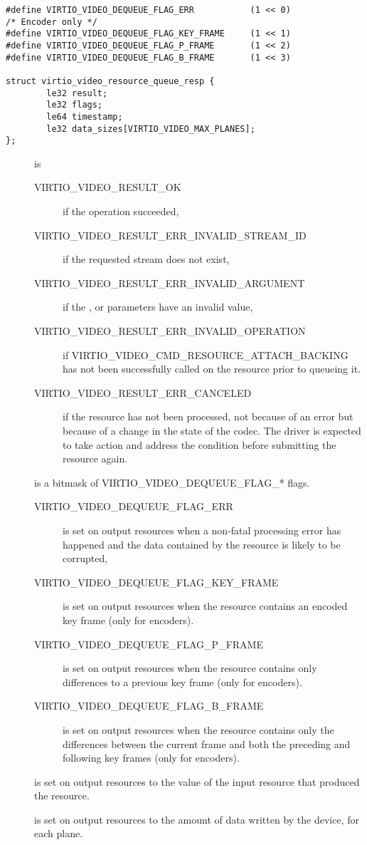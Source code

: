 \begin{lstlisting}
#define VIRTIO_VIDEO_DEQUEUE_FLAG_ERR           (1 << 0)
/* Encoder only */
#define VIRTIO_VIDEO_DEQUEUE_FLAG_KEY_FRAME     (1 << 1)
#define VIRTIO_VIDEO_DEQUEUE_FLAG_P_FRAME       (1 << 2)
#define VIRTIO_VIDEO_DEQUEUE_FLAG_B_FRAME       (1 << 3)

struct virtio_video_resource_queue_resp {
        le32 result;
        le32 flags;
        le64 timestamp;
        le32 data_sizes[VIRTIO_VIDEO_MAX_PLANES];
};
\end{lstlisting}

\begin{description}
\item[]
is

\begin{description}
\item[VIRTIO\_VIDEO\_RESULT\_OK]
if the operation succeeded,
\item[VIRTIO\_VIDEO\_RESULT\_ERR\_INVALID\_STREAM\_ID]
if the requested stream does not exist,
\item[VIRTIO\_VIDEO\_RESULT\_ERR\_INVALID\_ARGUMENT]
if the ,  or 
parameters have an invalid value,
\item[VIRTIO\_VIDEO\_RESULT\_ERR\_INVALID\_OPERATION]
if VIRTIO\_VIDEO\_CMD\_RESOURCE\_ATTACH\_BACKING has not been
successfully called on the resource prior to queueing it.
\item[VIRTIO\_VIDEO\_RESULT\_ERR\_CANCELED]
if the resource has not been processed, not because of an error but
because of a change in the state of the codec. The driver is expected to
take action and address the condition before submitting the resource
again.
\end{description}
\item[]
is a bitmask of VIRTIO\_VIDEO\_DEQUEUE\_FLAG\_* flags.

\begin{description}
\item[VIRTIO\_VIDEO\_DEQUEUE\_FLAG\_ERR]
is set on output resources when a non-fatal processing error has
happened and the data contained by the resource is likely to be
corrupted,
\item[VIRTIO\_VIDEO\_DEQUEUE\_FLAG\_KEY\_FRAME]
is set on output resources when the resource contains an encoded key
frame (only for encoders).
\item[VIRTIO\_VIDEO\_DEQUEUE\_FLAG\_P\_FRAME]
is set on output resources when the resource contains only differences
to a previous key frame (only for encoders).
\item[VIRTIO\_VIDEO\_DEQUEUE\_FLAG\_B\_FRAME]
is set on output resources when the resource contains only the
differences between the current frame and both the preceding and
following key frames (only for encoders).
\end{description}
\item[]
is set on output resources to the  value of the input
resource that produced the resource.
\item[]
is set on output resources to the amount of data written by the device,
for each plane.
\end{description}


